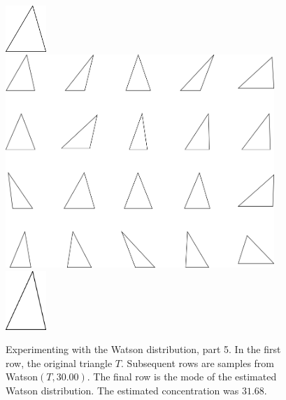 \begin{figure}
\includegraphics[width=0.6in]{output/1.models/test_watson/watson_5_true.png}\\ 
\includegraphics[width=4in]{output/1.models/test_watson/watson_5_samples.png}\\ 
\includegraphics[width=0.6in]{output/1.models/test_watson/watson_5_est.png}
\caption{Experimenting with the Watson distribution, part 5. In the first row, the original triangle $T$. Subsequent rows are samples from Watson$(T,30.00)$. The final row is the mode of the estimated Watson distribution. The estimated concentration was $31.68$.}
\label{fig-watson-5}
\end{figure}

